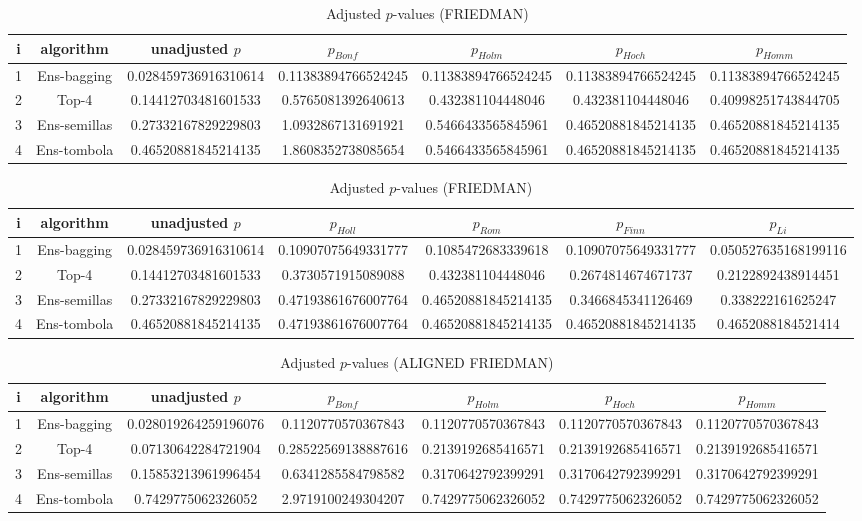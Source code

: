 \documentclass[a4paper,10pt]{article}
\begin{document}
\begin{landscape}
\newpage

\begin{table}[!htp]
\centering\scriptsize
\caption{Adjusted $p$-values (FRIEDMAN)}
\begin{tabular}{ccccccc}
i&algorithm&unadjusted $p$&$p_{Bonf}$&$p_{Holm}$&$p_{Hoch}$&$p_{Homm}$\\
\hline
1&Ens-bagging&0.028459736916310614&0.11383894766524245&0.11383894766524245&0.11383894766524245&0.11383894766524245\\
2&Top-4&0.14412703481601533&0.5765081392640613&0.432381104448046&0.432381104448046&0.40998251743844705\\
3&Ens-semillas&0.27332167829229803&1.0932867131691921&0.5466433565845961&0.46520881845214135&0.46520881845214135\\
4&Ens-tombola&0.46520881845214135&1.8608352738085654&0.5466433565845961&0.46520881845214135&0.46520881845214135\\
\hline
\end{tabular}
\end{table}

\begin{table}[!htp]
\centering\scriptsize
\caption{Adjusted $p$-values (FRIEDMAN)}
\begin{tabular}{ccccccc}
i&algorithm&unadjusted $p$&$p_{Holl}$&$p_{Rom}$&$p_{Finn}$&$p_{Li}$\\
\hline
1&Ens-bagging&0.028459736916310614&0.10907075649331777&0.1085472683339618&0.10907075649331777&0.050527635168199116\\
2&Top-4&0.14412703481601533&0.3730571915089088&0.432381104448046&0.2674814674671737&0.2122892438914451\\
3&Ens-semillas&0.27332167829229803&0.47193861676007764&0.46520881845214135&0.3466845341126469&0.338222161625247\\
4&Ens-tombola&0.46520881845214135&0.47193861676007764&0.46520881845214135&0.46520881845214135&0.4652088184521414\\
\hline
\end{tabular}
\end{table}


\newpage

\begin{table}[!htp]
\centering\scriptsize
\caption{Adjusted $p$-values (ALIGNED FRIEDMAN)}
\begin{tabular}{ccccccc}
i&algorithm&unadjusted $p$&$p_{Bonf}$&$p_{Holm}$&$p_{Hoch}$&$p_{Homm}$\\
\hline
1&Ens-bagging&0.028019264259196076&0.1120770570367843&0.1120770570367843&0.1120770570367843&0.1120770570367843\\
2&Top-4&0.07130642284721904&0.28522569138887616&0.2139192685416571&0.2139192685416571&0.2139192685416571\\
3&Ens-semillas&0.15853213961996454&0.6341285584798582&0.3170642792399291&0.3170642792399291&0.3170642792399291\\
4&Ens-tombola&0.7429775062326052&2.9719100249304207&0.7429775062326052&0.7429775062326052&0.7429775062326052\\
\hline
\end{tabular}
\end{table}


\end{landscape}
\end{document}
